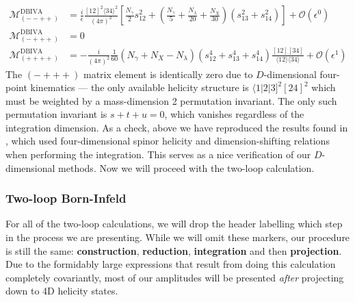\documentclass[12pt,letter]{article}
\begin{document}
\begin{align}
\mathcal{M}^{\text{DBIVA}} _{(--++)}&=\frac{i}{\epsilon} \frac{[12]^2\langle34\rangle^2}{(4\pi)^2}\left[\frac{N_\gamma}{2}s_{12}^2+\left(\frac{N_\gamma}{5}+\frac{N_\lambda}{20}+\frac{N_X}{30}\right)(s_{13}^2+s_{14}^2)\right]+\mathcal{O}(\epsilon^0)
\\
\mathcal{M}^{\text{DBIVA}}_{(-+++)}&= 0
\\
\mathcal{M}^{\text{DBIVA}}_{(++++)}&= -\frac{i}{(4\pi)^2}\frac{1}{60}\left(N_\gamma+N_X-N_\lambda\right) (s_{12}^4+s_{13}^4+s_{14}^4)\frac{[12][34]}{\langle12\rangle\langle 34\rangle}+\mathcal{O}(\epsilon^1) \label{eq:generalDBI1loop}
\end{align}
The $(-+++)$ matrix element is identically zero due to $D$-dimensional four-point kinematics --- the only available helicity structure is $\langle 1|2|3]^2[24]^2$ which must be weighted by a mass-dimension 2 permutation invariant. The only such permutation invariant is $s+t+u =0$, which vanishes regardless of the integration dimension. As a check, above we have reproduced the results found in \cite{Elvang:2020kuj}, which used four-dimensional spinor helicity and dimension-shifting relations when performing the integration. This serves as a nice verification of our $D$-dimensional methods. Now we will proceed with the two-loop calculation. 
\subsubsection{Two-loop Born-Infeld}\label{sec:2loopBIU}
For all of the two-loop calculations, we will drop the header labelling which step in the process we are presenting. While we will omit these markers, our procedure is still the same: \textbf{construction}, \textbf{reduction}, \textbf{integration} and then \textbf{projection}. Due to the formidably large expressions that result from doing this calculation completely covariantly, most of our amplitudes will be presented \textit{after} projecting down to 4D helicity states. 
\end{document}
